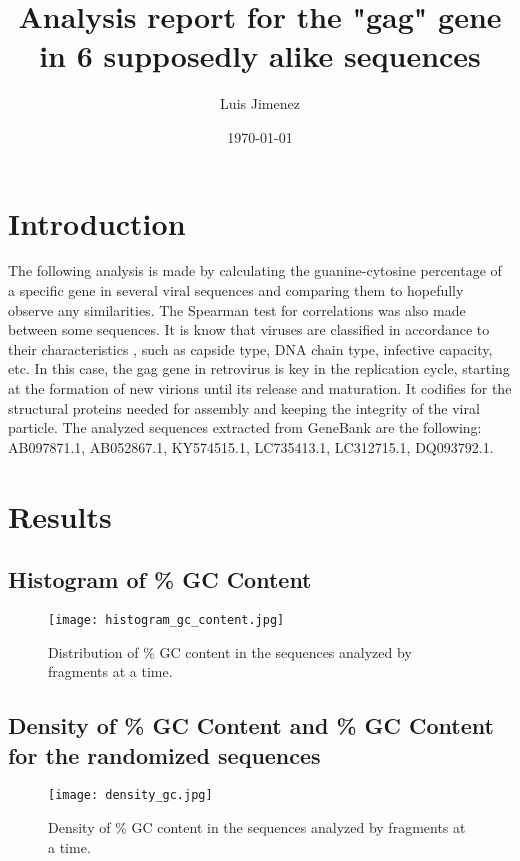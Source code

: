 \documentclass{article}%
\title{Analysis report for the "gag" gene in 6 supposedly alike sequences}%
\author{Luis Jimenez}%
\date{\today}%
\begin{document}
%
\normalsize%
\maketitle%
\section{Introduction}%
\label{sec:Introduction}%
The following analysis is made by calculating the guanine{-}cytosine percentage of a specific gene in several viral sequences and comparing them to hopefully observe any similarities. The Spearman test for correlations was also made between some sequences. It is know that viruses are classified in accordance to their characteristics , such as capside type, DNA chain type, infective capacity, etc. In this case, the gag gene in retrovirus is key in the replication cycle, starting at the formation of new virions until its release and maturation. It codifies for the structural proteins needed for assembly and keeping the integrity of the viral particle. The analyzed sequences extracted from GeneBank are the following: AB097871.1, AB052867.1, KY574515.1, LC735413.1, LC312715.1, DQ093792.1.

%
\section{Results}%
\label{sec:Results}%
\subsection{Histogram of \% GC Content}%
\label{subsec:HistogramofGCContent}%


\begin{figure}[h!]%
\centering%
\texttt{[image: histogram\_gc\_content.jpg]}%
\caption{Distribution of \% GC content in the sequences analyzed by fragments at a time.}%
\end{figure}

%
\subsection{Density of \% GC Content and \% GC Content for the randomized sequences}%
\label{subsec:DensityofGCContentandGCContentfortherandomizedsequences}%


\begin{figure}[!htbp]%
\centering%
\texttt{[image: density\_gc.jpg]}%
\caption{Density of \% GC content in the sequences analyzed by fragments at a time.}%
\end{figure}
\end{document}

